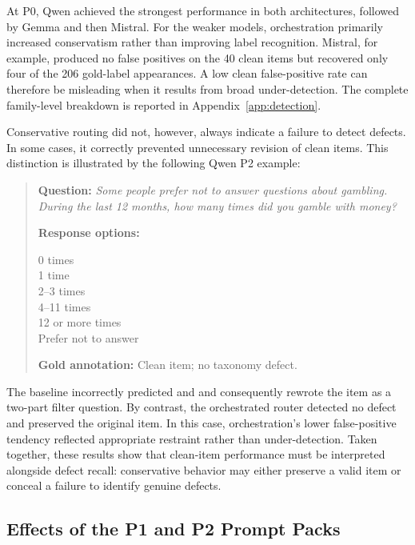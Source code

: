 \documentclass[11pt,a4paper]{article}
\newcommand{\code}[1]{%
    \texttt{\detokenize{#1}}%
}
\begin{document}
At P0, Qwen achieved the strongest performance in both architectures, followed
by Gemma and then Mistral. For the weaker models, orchestration primarily
increased conservatism rather than improving label recognition. Mistral, for
example, produced no false positives on the 40 clean items but recovered only
four of the 206 gold-label appearances. A low clean false-positive rate can
therefore be misleading when it results from broad under-detection. The complete
family-level breakdown is reported in Appendix~\ref{app:detection}.

Conservative routing did not, however, always indicate a failure to detect
defects. In some cases, it correctly prevented unnecessary revision of clean
items. This distinction is illustrated by the following Qwen P2 example:

\begin{quote}
\small

\textbf{Question:} \emph{Some people prefer not to answer questions about
gambling. During the last 12 months, how many times did you gamble with money?}

\medskip
\textbf{Response options:}

0 times\\
1 time\\
2--3 times\\
4--11 times\\
12 or more times\\
Prefer not to answer

\medskip
\textbf{Gold annotation:} Clean item; no taxonomy defect.
\end{quote}

The baseline incorrectly predicted \code{incomplete_options} and
\code{loaded_question} and consequently rewrote the item as a two-part filter
question. By contrast, the orchestrated router detected no defect and preserved
the original item. In this case, orchestration's lower false-positive tendency
reflected appropriate restraint rather than under-detection. Taken together,
these results show that clean-item performance must be interpreted alongside
defect recall: conservative behavior may either preserve a valid item or conceal
a failure to identify genuine defects.


\subsection{Effects of the P1 and P2 Prompt Packs}
\label{subsec:prompt-results}
\label{subsec:prompt-discussion}
\end{document}
